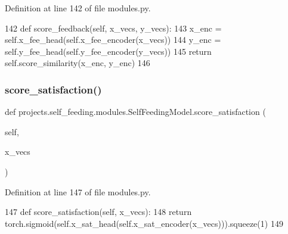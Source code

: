Definition at line 142 of file modules.\+py.


\begin{DoxyCode}
142     \textcolor{keyword}{def }score\_feedback(self, x\_vecs, y\_vecs):
143         x\_enc = self.x\_fee\_head(self.x\_fee\_encoder(x\_vecs))
144         y\_enc = self.y\_fee\_head(self.y\_fee\_encoder(y\_vecs))
145         \textcolor{keywordflow}{return} self.score\_similarity(x\_enc, y\_enc)
146 
\end{DoxyCode}
\mbox{\label{classprojects_1_1self__feeding_1_1modules_1_1SelfFeedingModel_a5657fa642e5449157c3be1c6e9f7c15d}} 
\subsubsection{\texorpdfstring{score\+\_\+satisfaction()}{score\_satisfaction()}}
{\footnotesize\ttfamily def projects.\+self\+\_\+feeding.\+modules.\+Self\+Feeding\+Model.\+score\+\_\+satisfaction (\begin{DoxyParamCaption}\item[{}]{self,  }\item[{}]{x\+\_\+vecs }\end{DoxyParamCaption})}



Definition at line 147 of file modules.\+py.


\begin{DoxyCode}
147     \textcolor{keyword}{def }score\_satisfaction(self, x\_vecs):
148         \textcolor{keywordflow}{return} torch.sigmoid(self.x\_sat\_head(self.x\_sat\_encoder(x\_vecs))).squeeze(1)
149 
\end{DoxyCode}
\mbox{\label{classprojects_1_1self__feeding_1_1modules_1_1SelfFeedingModel_aab1752ab5dcfc6b0c24b20c839285ee5}} 
